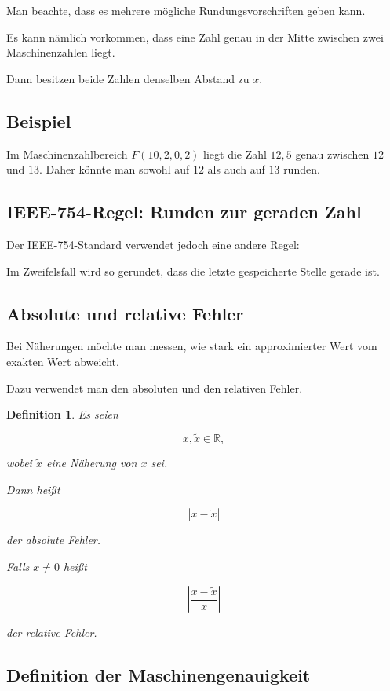 \documentclass{article}
\newcommand{\R}{\mathbb{R}}%
\newtheorem{defn}[thm]{Definition}
\begin{document}
Man beachte, dass es mehrere mögliche Rundungsvorschriften geben kann.

Es kann nämlich vorkommen, dass eine Zahl genau in der Mitte zwischen zwei Maschinenzahlen liegt.

Dann besitzen beide Zahlen denselben Abstand zu \(x\).

\subsection*{Beispiel}

Im Maschinenzahlbereich \(F(10,2,0,2)\) liegt die Zahl \(12{,}5\) genau zwischen \(12\) und \(13\). Daher könnte man sowohl auf \(12\) als auch auf \(13\) runden.

\subsection*{IEEE-754-Regel: Runden zur geraden Zahl}

Der IEEE-754-Standard verwendet jedoch eine andere Regel:

Im Zweifelsfall wird so gerundet, dass die letzte gespeicherte Stelle gerade ist.

\subsection*{Absolute und relative Fehler}

Bei Näherungen möchte man messen, wie stark ein approximierter Wert vom exakten Wert abweicht.

Dazu verwendet man den absoluten und den relativen Fehler.

\begin{defn}
Es seien

\[
x,\tilde{x}\in\R,
\]

wobei \(\tilde{x}\) eine Näherung von \(x\) sei.

Dann heißt

\[
|x-\tilde{x}|
\]

der \emph{absolute Fehler}.

Falls \(x\neq 0\) heißt

\[
\left|\frac{x-\tilde{x}}{x}\right|
\]

der \emph{relative Fehler}.
\end{defn}

\subsection*{Definition der Maschinengenauigkeit}
\end{document}
